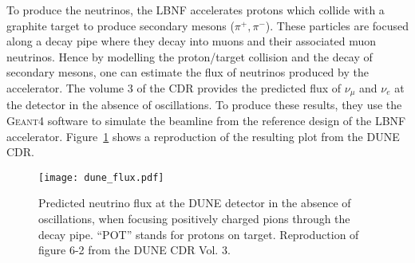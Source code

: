 To produce the neutrinos, the LBNF accelerates protons which collide with a
graphite target to produce secondary mesons ($\pi^+, \pi^-$). These particles are focused
along a decay pipe where they decay into muons and their associated muon
neutrinos\cite{papadimitriou}. Hence by modelling the proton/target collision and the
decay of secondary mesons, one can estimate the flux of neutrinos produced by
the accelerator. The volume 3 of the CDR\cite{cdr_vol3} provides the predicted
flux of $\nu_\mu$ and $\nu_e$ at the detector in the absence of oscillations.
To produce these results, they use the \textsc{Geant4}\cite{Geant4} software to simulate
the beamline from the reference design of the LBNF accelerator.
Figure~\ref{fig:nuflux} shows a reproduction of the resulting plot from the DUNE CDR.
\begin{figure}
	\centering
	\texttt{[image: dune\_flux.pdf]}
	\caption{Predicted neutrino flux at the DUNE detector in the absence of
	oscillations, when focusing positively charged pions through the decay pipe. 
	``POT'' stands for protons on target.
	Reproduction of figure 6-2 from the DUNE CDR Vol.
	3\cite{cdr_vol3}.}
	\label{fig:nuflux}
\end{figure}


